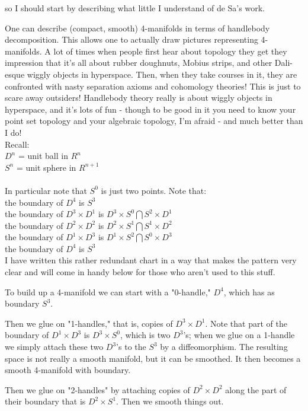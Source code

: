 so I should start by describing what little I understand of de Sa's work.

One can describe (compact, smooth) 4-manifolds in terms of handlebody decomposition. This allows one to actually draw pictures representing 4-manifolds. A lot of times when people first hear about topology they get they impression that it's all about rubber doughnuts, Mobius strips, and other Dali-esque wiggly objects in hyperspace. Then, when they take courses in it, they are confronted with nasty separation axioms and cohomology theories! This is just to scare away outsiders! Handlebody theory really is about wiggly objects in hyperspace, and it's lots of fun - though to be good in it you need to know your point set topology and your algebraic topology, I'm afraid - and much better than I do!
\\
Recall: 
\\
$D^n$ = unit ball in $R^n$\\
$S^n$ = unit sphere in $R^{n+1}$\\
\\
In particular note that $S^0$ is just two points. Note that:
\\
the boundary of $D^4$ is $S^3$\\
the boundary of $D^3 \times D^1$ is $D^3 \times S^0 \bigcap S^2 \times D^1$\\
the boundary of $D^2 \times D^2$ is $D^2 \times S^1 \bigcap S^1 \times D^2$\\
the boundary of $D^1 \times D^3$ is $D^1 \times S^2 \bigcap S^0 \times D^3$\\
the boundary of $D^4$ is $S^3$\\

I have written this rather redundant chart in a way that makes the pattern very clear and will come in handy below for those who aren't used to this stuff.

To build up a 4-manifold we can start with a "0-handle," $D^4$, which has as boundary $S^3$.

Then we glue on "1-handles," that is, copies of $D^3 \times D^1$. Note that part of the boundary of $D^1 \times D^3$ is $D^3 \times S^0$, which is two $D^3$'s; when we glue on a 1-handle we simply attach these two $D^3$'s to the $S^3$ by a diffeomorphism. The resulting space is not really a smooth manifold, but it can be smoothed. It then becomes a smooth 4-manifold with boundary.

Then we glue on "2-handles" by attaching copies of $D^2 \times D^2$ along the part of their boundary that is $D^2 \times S^1$. Then we smooth things out.

